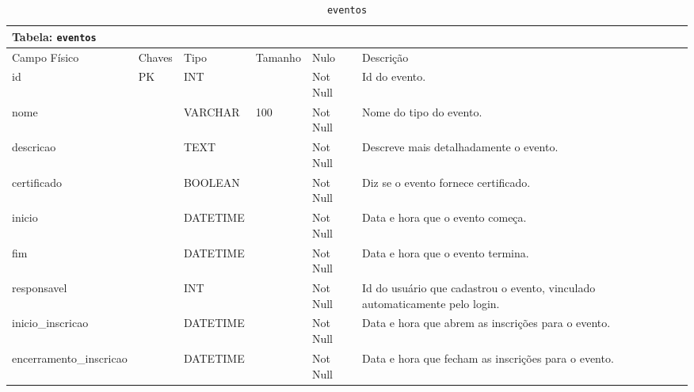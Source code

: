\documentclass[12pt,a4paper]{article}
\begin{document}
\begin{center}
\begin{table}[h!]
	\caption{\texttt{eventos}}
	\label{tabela:eventos}
	\begin{tabular}{|p{2.3cm}|p{1.2cm}|p{1.8cm}|p{1.5cm}|p{1cm}|p{6cm}|}\hline		
		\multicolumn{6}{|p{16cm}|}{\cellcolor{cinzaClaro}  \centering Tabela: \texttt{eventos}} \\ \hline %
		{\small Campo Físico}   & {\small Chaves} & {\small Tipo} & {\small Tamanho} & {\small Nulo} & {\small Descrição}\\\hline %
		
		{\tiny id} & {\tiny PK} & {\tiny INT} & {\tiny } & {\tiny Not Null} &{\tiny Id do evento.}\\\hline
		{\tiny nome} & {\tiny } & {\tiny VARCHAR} & {\tiny 100} & {\tiny Not Null} &{\tiny Nome do tipo do evento.}\\\hline
		{\tiny descricao} & {\tiny } & {\tiny TEXT} & {\tiny } & {\tiny Not Null} &{\tiny Descreve mais detalhadamente o evento.}\\\hline
		{\tiny certificado} & {\tiny } & {\tiny BOOLEAN} & {\tiny } & {\tiny Not Null} &{\tiny Diz se o evento fornece certificado.}\\\hline
		{\tiny inicio} & {\tiny } & {\tiny DATETIME} & {\tiny } & {\tiny Not Null} &{\tiny Data e hora que o evento começa.}\\\hline
		{\tiny fim} & {\tiny } & {\tiny DATETIME} & {\tiny } & {\tiny Not Null} &{\tiny Data e hora que o evento termina.}\\\hline
		{\tiny responsavel} & {\tiny } & {\tiny INT} & {\tiny } & {\tiny Not Null} &{\tiny Id do usuário que cadastrou o evento, vinculado automaticamente pelo login.}\\\hline
		{\tiny inicio\_inscricao} & {\tiny } & {\tiny DATETIME} & {\tiny } & {\tiny Not Null} &{\tiny Data e hora que abrem as inscrições para o evento.}\\\hline
		{\tiny encerramento\_inscricao} & {\tiny } & {\tiny DATETIME} & {\tiny } & {\tiny Not Null} &{\tiny Data e hora que fecham as inscrições para o evento.}\\\hline
		
			
	\end{tabular}
\end{table}	
\end{center}
\end{document}
